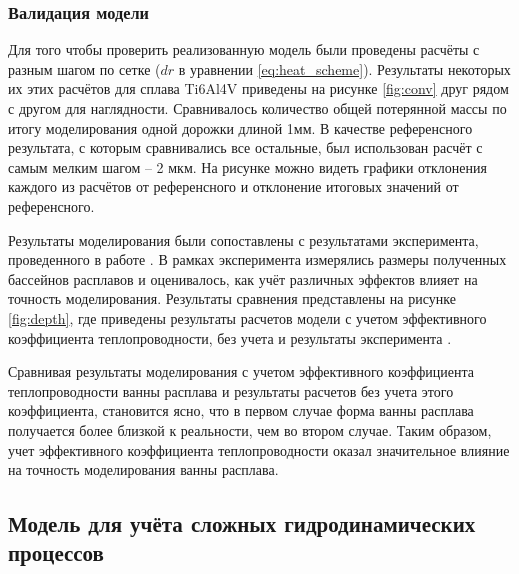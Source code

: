 \subsubsection{Валидация модели}

Для того чтобы проверить реализованную модель были проведены расчёты с разным шагом по сетке ($dr$ в уравнении \ref{eq:heat_scheme}). Результаты некоторых их этих расчётов для сплава Ti6Al4V приведены на рисунке \ref{fig:conv} друг рядом с другом для наглядности. Сравнивалось количество общей потерянной массы по итогу моделирования одной дорожки длиной 1мм. В качестве референсного результата, с которым сравнивались все остальные, был использован расчёт с самым мелким шагом -- 2 мкм. На рисунке можно видеть графики отклонения каждого из расчётов от референсного и отклонение итоговых значений от референсного.



Результаты моделирования были сопоставлены с результатами эксперимента, проведенного в работе \cite{klassen2018simulation}. В рамках эксперимента измерялись размеры полученных бассейнов расплавов и оценивалось, как учёт различных эффектов влияет на точность моделирования. Результаты сравнения представлены на рисунке \ref{fig:depth}, где приведены результаты расчетов модели с учетом эффективного коэффициента теплопроводности, без учета и результаты эксперимента \cite{klassen2018simulation}.


Сравнивая результаты моделирования с учетом эффективного коэффициента теплопроводности ванны расплава и результаты расчетов без учета этого коэффициента, становится ясно, что в первом случае форма ванны расплава получается более близкой к реальности, чем во втором случае. Таким образом, учет эффективного коэффициента теплопроводности оказал значительное влияние на точность моделирования ванны расплава.

\subsection{Модель для учёта сложных гидродинамических процессов}

